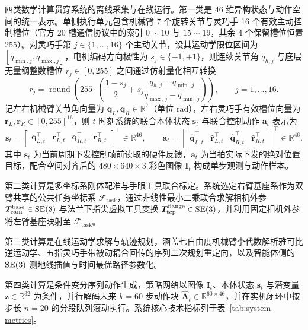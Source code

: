 四类数学计算贯穿系统的离线采集与在线运行。第一类是 46 维异构状态与动作空间的统一表示。单侧执行单元包含机械臂 7 个旋转关节与灵巧手 16 个有效主动控制槽位（官方 20 槽通信协议中的索引 $0\sim 10$ 与 $15\sim 19$，其余 4 个保留槽位恒置 255）。对灵巧手第 $j \in \{1,\dots,16\}$ 个主动关节，设其运动学限位区间为 $[q_{\min,j}, q_{\max,j}]$，电机编码方向极性为 $s_j \in \{-1, +1\}$，则连续关节角 $q_{h,j}$ 与底层无量纲整数槽位 $r_j \in [0, 255]$ 之间通过仿射量化相互转换
\begin{equation}
  r_j = \operatorname{round}\!\left(255 \cdot \left(\frac{1 - s_j}{2} + s_j \frac{q_{h,j} - q_{\min,j}}{q_{\max,j} - q_{\min,j}}\right)\right), \qquad j = 1,\dots,16.
  \label{eq:hand-slot-quant}
\end{equation}
记左右机械臂关节角向量为 $\bm{q}_L, \bm{q}_R \in \mathbb{R}^7$（单位 $\mathrm{rad}$），左右灵巧手有效槽位向量为 $\bm{r}_L, \bm{r}_R \in [0, 255]^{16}$，则 $t$ 时刻系统的联合本体状态 $\bm{s}_t$ 与联合控制动作 $\bm{a}_t$ 表示为
\begin{equation}
  \bm{s}_t = \begin{bmatrix} \bm{q}_{L,t}^{\top} & \bm{r}_{L,t}^{\top} & \bm{q}_{R,t}^{\top} & \bm{r}_{R,t}^{\top} \end{bmatrix}^{\top} \in \mathbb{R}^{46}, \qquad
  \bm{a}_t = \begin{bmatrix} \hat{\bm{q}}_{L,t}^{\top} & \hat{\bm{r}}_{L,t}^{\top} & \hat{\bm{q}}_{R,t}^{\top} & \hat{\bm{r}}_{R,t}^{\top} \end{bmatrix}^{\top} \in \mathbb{R}^{46}.
  \label{eq:state-action-46d}
\end{equation}
其中 $\bm{s}_t$ 为当前周期下发控制帧前读取的硬件反馈，$\bm{a}_t$ 为当拍实际下发的绝对位置目标，配合空间对齐后的 $480\times 640\times 3$ 彩色图像 $\bm{I}_t$ 构成单步观测与动作样本。

第二类计算是多坐标系刚体配准与手眼工具联合标定。系统选定右臂基座系作为双臂共享的公共任务坐标系 $\mathcal{F}_{\text{task}}$，通过非线性最小二乘联合求解相机外参 $\bm{T}_{\text{cam}}^{\text{base}} \in \mathrm{SE}(3)$ 与法兰下指尖虚拟工具变换 $\bm{T}_{\text{tcp}}^{\text{flange}} \in \mathrm{SE}(3)$，并利用固定相机外参将左臂基座映射至 $\mathcal{F}_{\text{task}}$。

第三类计算是在线运动学求解与轨迹规划，涵盖七自由度机械臂李代数解析雅可比逆运动学、五指灵巧手带被动耦合回传的序列二次规划重定向，以及智能体侧的 $\mathrm{SE}(3)$ 测地线插值与时间最优路径参数化。

第四类计算是条件变分序列动作生成，策略网络以图像 $\bm{I}_t$、本体状态 $\bm{s}_t$ 与潜变量 $\bm{z} \in \mathbb{R}^{32}$ 为条件，并行解码未来 $k=60$ 步动作块 $\hat{\bm{A}}_t \in \mathbb{R}^{60\times 46}$，并在实机闭环中按步长 $n=20$ 的分段队列滚动执行。系统核心技术指标列于表~\ref{tab:system-metrics}。


